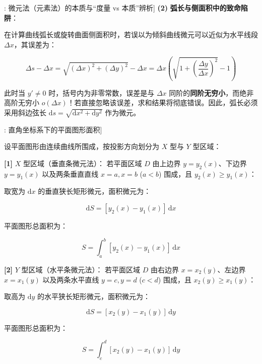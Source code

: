 \documentclass[11pt,a4paper,UTF8]{ctexart}
\begin{document}
\begin{thmbox}[方法[1]: 微元法（元素法）的本质与“度量 vs 本质”辨析]
\textbf{(2)}  \textbf{弧长与侧面积中的致命陷阱}：

在计算曲线弧长或旋转曲面侧面积时，若误以为倾斜曲线微元可以近似为水平线段 $\Delta x$，其误差为：


\begin{equation*}
\Delta s - \Delta x = \sqrt{(\Delta x)^2 + (\Delta y)^2} - \Delta x = \Delta x \left(\sqrt{1 + \left(\frac{\Delta y}{\Delta x}\right)^2} - 1\right)
\end{equation*}


此时当 $y' \neq 0$ 时，括号内为非零常数，误差是与 $\Delta x$ 同阶的\textbf{同阶无穷小}，而绝非高阶无穷小 $o(\Delta x)$！若直接忽略该误差，求和结果将彻底错误。因此，弧长必须采用斜边弦长 $\mathrm{d}s = \sqrt{\mathrm{d}x^2 + \mathrm{d}y^2}$ 作为微元。

\end{thmbox}
\begin{thmbox}[公式[1]: 直角坐标系下的平面图形面积]

设平面图形由连续曲线所围成，按投影方向划分为 $X$ 型与 $Y$ 型区域：

\textbf{[1]} $X$ 型区域（垂直条微元法）：
若平面区域 $D$ 由上边界 $y = y_2(x)$、下边界 $y = y_1(x)$ 以及两条垂直直线 $x = a, x = b$ ($a < b$) 围成，且 $y_2(x) \geqslant y_1(x)$：

取宽为 $\mathrm{d}x$ 的垂直狭长矩形微元，面积微元为：


\begin{equation*}
\mathrm{d}S = [y_2(x) - y_1(x)]\,\mathrm{d}x
\end{equation*}


平面图形总面积为：


\begin{equation*}
S = \int_a^b [y_2(x) - y_1(x)]\,\mathrm{d}x
\end{equation*}


\textbf{[2]} $Y$ 型区域（水平条微元法）：
若平面区域 $D$ 由右边界 $x = x_2(y)$、左边界 $x = x_1(y)$ 以及两条水平直线 $y = c, y = d$ ($c < d$) 围成，且 $x_2(y) \geqslant x_1(y)$：

取高为 $\mathrm{d}y$ 的水平狭长矩形微元，面积微元为：


\begin{equation*}
\mathrm{d}S = [x_2(y) - x_1(y)]\,\mathrm{d}y
\end{equation*}


平面图形总面积为：


\begin{equation*}
S = \int_c^d [x_2(y) - x_1(y)]\,\mathrm{d}y
\end{equation*}


\end{thmbox}
\end{document}
